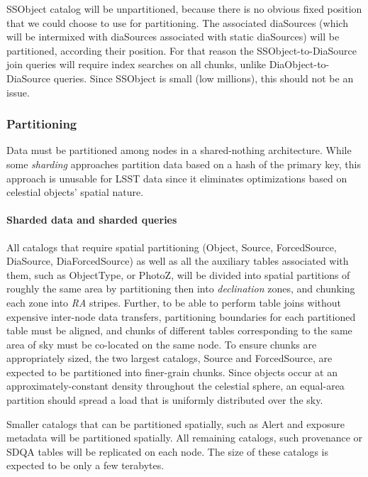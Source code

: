 \documentclass[DM,lsstdraft,toc]{lsstdoc}
\begin{document}
SSObject catalog will be unpartitioned, because there is no obvious
fixed position that we could choose to use for partitioning. The
associated diaSources (which will be intermixed with diaSources
associated with static diaSources) will be partitioned, according their
position. For that reason the SSObject-to-DiaSource join queries will
require index searches on all chunks, unlike DiaObject-to-DiaSource
queries. Since SSObject is small (low millions), this should not be an
issue.

\subsubsection{Partitioning}\label{partitioning}

Data must be partitioned among nodes in a shared-nothing architecture.
While some \emph{sharding} approaches partition data based on a hash of
the primary key, this approach is unusable for LSST data since it
eliminates optimizations based on celestial objects' spatial nature.

\paragraph{Sharded data and sharded
queries}\label{sharded-data-and-sharded-queries}

All catalogs that require spatial partitioning (Object, Source,
ForcedSource, DiaSource, DiaForcedSource) as well as all the auxiliary
tables associated with them, such as ObjectType, or PhotoZ, will be
divided into spatial partitions of roughly the same area by partitioning
then into \emph{declination} zones, and chunking each zone into
\emph{RA} stripes. Further, to be able to perform table joins without
expensive inter-node data transfers, partitioning boundaries for each
partitioned table must be aligned, and chunks of different tables
corresponding to the same area of sky must be co-located on the same
node. To ensure chunks are appropriately sized, the two largest
catalogs, Source and ForcedSource, are expected to be partitioned into
finer-grain chunks. Since objects occur at an approximately-constant
density throughout the celestial sphere, an equal-area partition should
spread a load that is uniformly distributed over the sky.

Smaller catalogs that can be partitioned spatially, such as Alert and
exposure metadata will be partitioned spatially. All remaining catalogs,
such provenance or SDQA tables will be replicated on each node. The size
of these catalogs is expected to be only a few terabytes.
\end{document}
